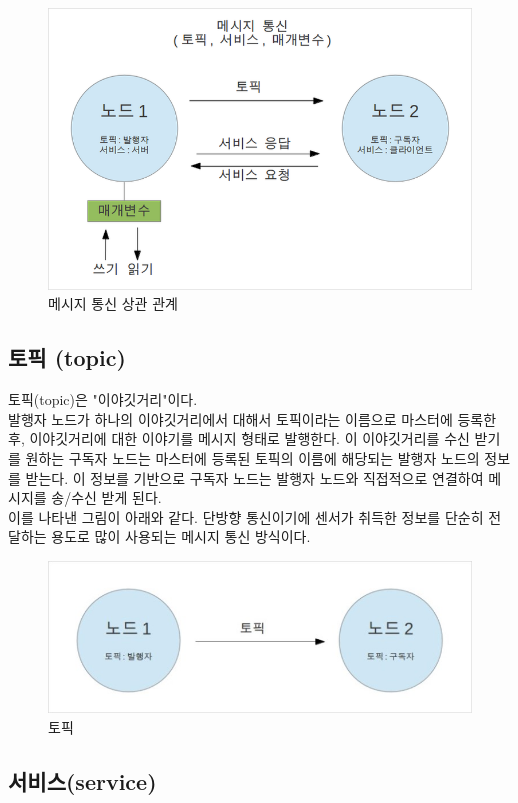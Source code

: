 \begin{figure}[h]
\centering\includegraphics[width=0.5\columnwidth]{pictures/chapter7/msgtrans1.png}
\caption{메시지 통신 상관 관계}
\end{figure}

\subsection{토픽 (topic)}

토픽(topic)은 "이야깃거리"이다.\\ 

발행자 노드가 하나의 이야깃거리에서 대해서 토픽이라는 이름으로 마스터에 등록한 후, 이야깃거리에 대한 이야기를 메시지 형태로 발행한다. 이 이야깃거리를 수신 받기를 원하는 구독자 노드는 마스터에 등록된 토픽의 이름에 해당되는 발행자 노드의 정보를 받는다. 이 정보를 기반으로 구독자 노드는 발행자 노드와 직접적으로 연결하여 메시지를 송/수신 받게 된다. \\

이를 나타낸 그림이 아래와 같다. 단방향 통신이기에 센서가 취득한 정보를 단순히 전달하는 용도로 많이 사용되는 메시지 통신 방식이다.

\begin{figure}[h]
\centering\includegraphics[width=0.5\columnwidth]{pictures/chapter7/msgtrans2.jpg}
\caption{토픽}
\end{figure}

\subsection{서비스(service)}

